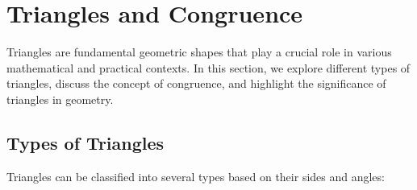 \documentclass[a4paper,12pt]{book}
\begin{document}

\section{Triangles and Congruence}
\label{sec:triangles_and_congruence}

Triangles are fundamental geometric shapes that play a crucial role in various mathematical and practical contexts. In this section, we explore different types of triangles, discuss the concept of congruence, and highlight the significance of triangles in geometry.

\subsection{Types of Triangles}

Triangles can be classified into several types based on their sides and angles:
\end{document}
